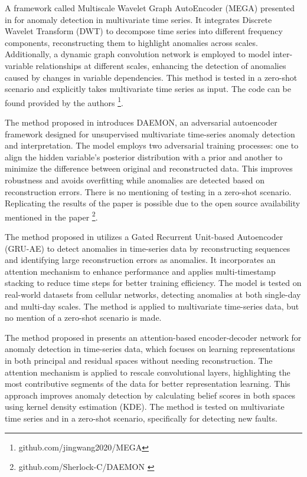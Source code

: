 A framework called Multiscale Wavelet Graph AutoEncoder (MEGA) presented in \cite{wang_multiscale_2023} for anomaly detection in multivariate time series. It integrates Discrete Wavelet Transform (DWT) to decompose time series into different frequency components, reconstructing them to highlight anomalies across scales. Additionally, a dynamic graph convolution network is employed to model inter-variable relationships at different scales, enhancing the detection of anomalies caused by changes in variable dependencies.
This method is tested in a zero-shot scenario and explicitly takes multivariate time series as input. The code can be found provided by the authors \footnote{\fussy\tiny github.com/jingwang2020/MEGA}.

The method proposed in \cite{chen_adversarial_2023} introduces DAEMON, an adversarial autoencoder framework designed for unsupervised multivariate time-series anomaly detection and interpretation. The model employs two adversarial training processes: one to align the hidden variable’s posterior distribution with a prior and another to minimize the difference between original and reconstructed data. This improves robustness and avoids overfitting while anomalies are detected based on reconstruction errors. There is no mentioning of testing in a zero-shot scenario.
Replicating the results of the paper is possible due to the open source availability mentioned in the paper
\footnote{\fussy\tiny github.com/Sherlock-C/DAEMON \label{foot_daemon}}.


The method proposed in \cite{gong_autoencoder-based_2022} utilizes a Gated Recurrent Unit-based Autoencoder (GRU-AE) to detect anomalies in time-series data by reconstructing sequences and identifying large reconstruction errors as anomalies. It incorporates an attention mechanism to enhance performance and applies multi-timestamp stacking to reduce time steps for better training efficiency. The model is tested on real-world datasets from cellular networks, detecting anomalies at both single-day and multi-day scales. The method is applied to multivariate time-series data, but no mention of a zero-shot scenario is made.

%
The method proposed in \cite{wang_attention-based_2022} presents an attention-based encoder-decoder network for anomaly detection in time-series data, which focuses on learning representations in both principal and residual spaces without needing reconstruction. The attention mechanism is applied to rescale convolutional layers, highlighting the most contributive segments of the data for better representation learning. This approach improves anomaly detection by calculating belief scores in both spaces using kernel density estimation (KDE). The method is tested on multivariate time series and in a zero-shot scenario, specifically for detecting new faults.

